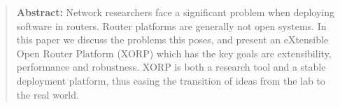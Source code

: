 
\begin{quotation}
\noindent\textbf{Abstract:} Network researchers face a significant problem when deploying software in routers.  Router platforms are generally not open systems.  In this paper we discuss the problems this poses, and present an eXtensible Open Router Platform (XORP) which has the key goals are extensibility, performance and robustness. XORP is both a research tool and a stable deployment platform, thus easing the transition of ideas from the
lab to the real world.
\end{quotation}

